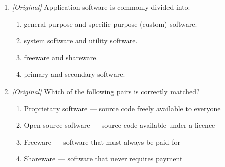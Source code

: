 \begin{enumerate}[label=\textbf{Q\arabic*.}, leftmargin=*]
\begin{enumerate}[label=\Alph*.]
    \item help users create documents and presentations.
    \item perform maintenance tasks such as antivirus scanning, disk
      cleanup, and backup.
    \item translate source code into machine code.
    \item connect two different applications to each other.
  \end{enumerate}
\item \textit{[Original]} Application software is commonly divided into:
  \begin{enumerate}[label=\Alph*.]
    \item general-purpose and specific-purpose (custom) software.
    \item system software and utility software.
    \item freeware and shareware.
    \item primary and secondary software.
  \end{enumerate}
\item \textit{[Original]} Which of the following pairs is correctly matched?
  \begin{enumerate}[label=\Alph*.]
    \item Proprietary software --- source code freely available to everyone
    \item Open-source software --- source code available under a licence
    \item Freeware --- software that must always be paid for
    \item Shareware --- software that never requires payment
  \end{enumerate}


\end{enumerate}
